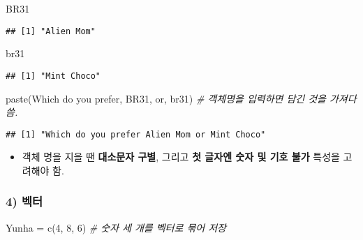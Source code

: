 \documentclass[
  12,
]{article}
\newenvironment{Shaded}{\begin{snugshade}}{\end{snugshade}}
\newcommand{\CommentTok}[1]{\textcolor[rgb]{0.56,0.35,0.01}{\textit{#1}}}
\newcommand{\DecValTok}[1]{\textcolor[rgb]{0.00,0.00,0.81}{#1}}
\newcommand{\FunctionTok}[1]{\textcolor[rgb]{0.00,0.00,0.00}{#1}}
\newcommand{\NormalTok}[1]{#1}
\newcommand{\OtherTok}[1]{\textcolor[rgb]{0.56,0.35,0.01}{#1}}
\newcommand{\StringTok}[1]{\textcolor[rgb]{0.31,0.60,0.02}{#1}}
\providecommand{\tightlist}{%
  \setlength{\itemsep}{0pt}\setlength{\parskip}{0pt}}
\begin{document}
\begin{Shaded}
\begin{Highlighting}[]
\NormalTok{BR31}
\end{Highlighting}
\end{Shaded}

\begin{verbatim}
## [1] "Alien Mom"
\end{verbatim}

\begin{Shaded}
\begin{Highlighting}[]
\NormalTok{br31}
\end{Highlighting}
\end{Shaded}

\begin{verbatim}
## [1] "Mint Choco"
\end{verbatim}

\begin{Shaded}
\begin{Highlighting}[]
\FunctionTok{paste}\NormalTok{(}\StringTok{\textquotesingle{}Which do you prefer\textquotesingle{}}\NormalTok{, BR31, }\StringTok{\textquotesingle{}or\textquotesingle{}}\NormalTok{, br31) }\CommentTok{\# 객체명을 입력하면 담긴 것을 가져다 씀.}
\end{Highlighting}
\end{Shaded}

\begin{verbatim}
## [1] "Which do you prefer Alien Mom or Mint Choco"
\end{verbatim}

\begin{itemize}
\tightlist
\item
  객체 명을 지을 땐 \textbf{대소문자 구별}, 그리고 \textbf{첫 글자엔
  숫자 및 기호 불가} 특성을 고려해야 함.
\end{itemize}

\hypertarget{uxbca1uxd130}{%
\subsubsection{4) 벡터}\label{uxbca1uxd130}}

\begin{Shaded}
\begin{Highlighting}[]
\NormalTok{Yunha }\OtherTok{=} \FunctionTok{c}\NormalTok{(}\DecValTok{4}\NormalTok{, }\DecValTok{8}\NormalTok{, }\DecValTok{6}\NormalTok{) }\CommentTok{\# 숫자 세 개를 벡터로 묶어 저장}
\end{Highlighting}
\end{Shaded}
\end{document}
